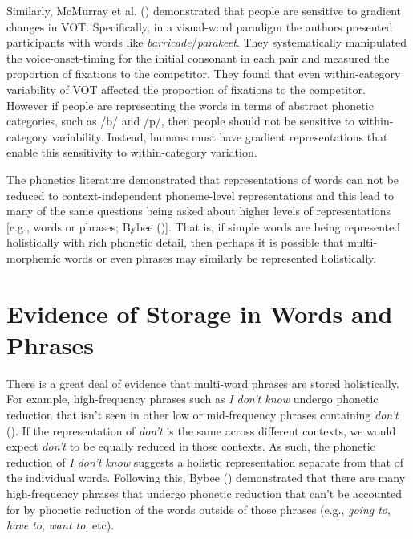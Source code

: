 \documentclass[
  12pt,
  letterpaper,
]{scrreport}
\begin{document}
Similarly, McMurray et al.
() demonstrated
that people are sensitive to gradient changes in VOT. Specifically, in a
visual-word paradigm the authors presented participants with words like
\emph{barricade}/\emph{parakeet}. They systematically manipulated the
voice-onset-timing for the initial consonant in each pair and measured
the proportion of fixations to the competitor. They found that even
within-category variability of VOT affected the proportion of fixations
to the competitor. However if people are representing the words in terms
of abstract phonetic categories, such as /b/ and /p/, then people should
not be sensitive to within-category variability. Instead, humans must
have gradient representations that enable this sensitivity to
within-category variation.

The phonetics literature demonstrated that representations of words can
not be reduced to context-independent phoneme-level representations and
this lead to many of the same questions being asked about higher levels
of representations {[}e.g., words or phrases; Bybee
(){]}. That is, if simple words are being
represented holistically with rich phonetic detail, then perhaps it is
possible that multi-morphemic words or even phrases may similarly be
represented holistically.

\section{Evidence of Storage in Words and
Phrases}\label{sec-evidence-of-storage-in-words-and-phrases}

There is a great deal of evidence that multi-word phrases are stored
holistically. For example, high-frequency phrases such as \emph{I don't
know} undergo phonetic reduction that isn't seen in other low or
mid-frequency phrases containing \emph{don't}
().
If the representation of \emph{don't} is the same across different
contexts, we would expect \emph{don't} to be equally reduced in those
contexts. As such, the phonetic reduction of \emph{I don't know}
suggests a holistic representation separate from that of the individual
words. Following this, Bybee ()
demonstrated that there are many high-frequency phrases that undergo
phonetic reduction that can't be accounted for by phonetic reduction of
the words outside of those phrases (e.g., \emph{going to}, \emph{have
to}, \emph{want to}, etc).
\end{document}

